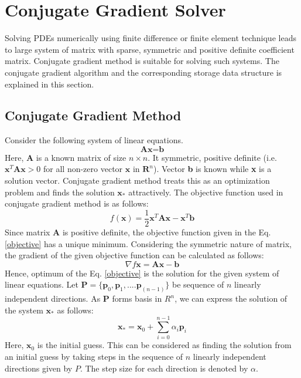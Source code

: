 \documentclass[sigplan,screen]{acmart}
\begin{document}
\section{Conjugate Gradient Solver}
Solving PDEs numerically using finite difference or finite element technique leads to large system of matrix with sparse, symmetric and positive definite coefficient matrix. Conjugate gradient method \cite{conjugate} is suitable for solving such systems. The conjugate gradient algorithm and the corresponding storage data structure is explained in this section. 
\subsection{Conjugate Gradient Method}
Consider the following system of linear equations.
\begin{equation}
\textbf{Ax}=\textbf{b}
\end{equation}
Here, \textbf{A} is a known matrix of size $n\times n$. It symmetric, positive definite (i.e. $\textbf{x}^T\textbf{A}\textbf{x} >0$ for all non-zero vector $\textbf{x}$ in $\textbf{R}^n$). Vector \textbf{b} is known while \textbf{x} is a solution vector. Conjugate gradient method treats this as an optimization problem and finds the solution $\textbf{x}_*$ attractively. The objective function used in conjugate gradient method is as follows:
\begin{equation}\label{objective}
f(\textbf{x})= \frac{1}{2}\textbf{x}^T\textbf{A}\textbf{x}-\textbf{x}^T\textbf{b}
\end{equation}
Since matrix \textbf{A} is positive definite, the objective function given in the Eq. \eqref{objective} has a unique minimum. Considering the symmetric nature of matrix, the gradient of the given objective function can be calculated as follows:
\begin{equation}
\nabla f{\textbf{x}} = \textbf{Ax}-\textbf{b}
\end{equation}
Hence, optimum of the Eq. \eqref{objective} is the solution for the given system of linear equations.
Let $\textbf{P}=\{\textbf{p}_0, \textbf{p}_1, ....\textbf{p}_{(n-1)}\}$ be sequence of $n$ linearly independent directions. As $\textbf{P}$ forms basis in $R^n$, we can express the solution of the system $\textbf{x}_*$ as follows:
\begin{equation}
\textbf{x}_*= \textbf{x}_0 + \sum_{i=0}^{n-1}\alpha_i\textbf{p}_i
\end{equation}
Here, $\textbf{x}_0$ is the initial guess. This can be considered as finding the solution from an initial guess by taking steps in the sequence of $n$ linearly independent directions given by $P$. The step size for each direction is denoted by $\alpha$.\\
\end{document}

